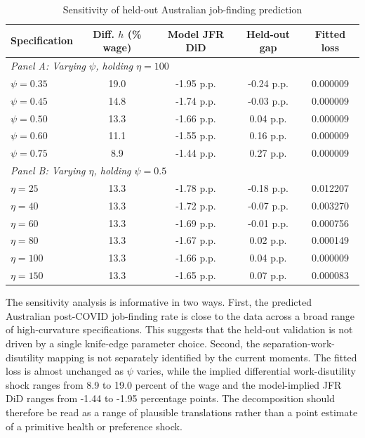 \begin{table}[htbp]
    \centering
    \caption{Sensitivity of held-out Australian job-finding prediction}
    \label{tab:model_sensitivity_14}
    \small
    \begin{tabular}{lcccc}
        \toprule
        Specification & Diff. $h$ (\% wage) & Model JFR DiD & Held-out gap & Fitted loss \\
        \midrule
        \multicolumn{5}{l}{\textit{Panel A: Varying $\psi$, holding $\eta=100$}} \\
        $\psi=0.35$ & 19.0 & -1.95 p.p. & -0.24 p.p. & 0.000009 \\
        $\psi=0.45$ & 14.8 & -1.74 p.p. & -0.03 p.p. & 0.000009 \\
        $\psi=0.50$ & 13.3 & -1.66 p.p. & 0.04 p.p. & 0.000009 \\
        $\psi=0.60$ & 11.1 & -1.55 p.p. & 0.16 p.p. & 0.000009 \\
        $\psi=0.75$ & 8.9 & -1.44 p.p. & 0.27 p.p. & 0.000009 \\
        \midrule
        \multicolumn{5}{l}{\textit{Panel B: Varying $\eta$, holding $\psi=0.5$}} \\
        $\eta=25$ & 13.3 & -1.78 p.p. & -0.18 p.p. & 0.012207 \\
        $\eta=40$ & 13.3 & -1.72 p.p. & -0.07 p.p. & 0.003270 \\
        $\eta=60$ & 13.3 & -1.69 p.p. & -0.01 p.p. & 0.000756 \\
        $\eta=80$ & 13.3 & -1.67 p.p. & 0.02 p.p. & 0.000149 \\
        $\eta=100$ & 13.3 & -1.66 p.p. & 0.04 p.p. & 0.000009 \\
        $\eta=150$ & 13.3 & -1.65 p.p. & 0.07 p.p. & 0.000083 \\
        \bottomrule
    \end{tabular}
\end{table}

The sensitivity analysis is informative in two ways. First, the predicted Australian post-COVID job-finding rate is close to the data across a broad range of high-curvature specifications. This suggests that the held-out validation is not driven by a single knife-edge parameter choice. Second, the separation-work-disutility mapping is not separately identified by the current moments. The fitted loss is almost unchanged as $\psi$ varies, while the implied differential work-disutility shock ranges from 8.9 to 19.0 percent of the wage and the model-implied JFR DiD ranges from -1.44 to -1.95 percentage points. The decomposition should therefore be read as a range of plausible translations rather than a point estimate of a primitive health or preference shock.

